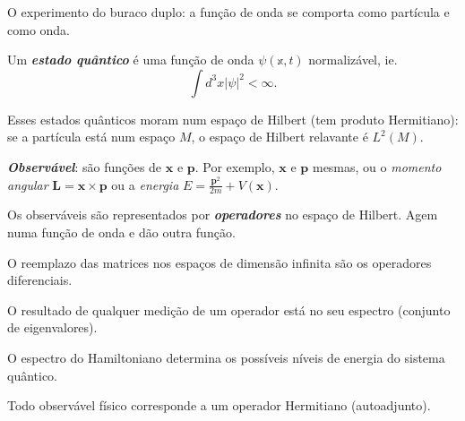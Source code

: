  O experimento do buraco duplo: a fun\c c\~ao de onda se comporta como part\'icula e como onda.

 \begin{defn}
 	Um \textit{\textbf{estado qu\^antico}} \'e uma fun\c c\~ao de onda $\psi(\mathbb{x},t)$ normaliz\'avel, ie.
	\[\int d^3x|\psi|^2<\infty.\]
 \end{defn}
 Esses estados qu\^anticos moram num espaço de Hilbert (tem produto Hermitiano): se a part\'icula est\'a num espaço $M$, o espaço de Hilbert relavante \'e $L^2(M)$.

\begin{defn}
	\textit{\textbf{Observ\'avel}}: s\~ao fun\c c\~oes  de $\mathbf{x}$ e $\mathbf{p}$. Por exemplo, $\mathbf{x}$ e $\mathbf{p}$ mesmas, ou o \textit{momento angular} $\mathbf{L}=\mathbf{x}\times \mathbf{p}$ ou a \textit{energia} $E=\frac{\mathbf{p}^2}{2m}+V(\mathbf{x})$.

	Os observ\'aveis s\~ao representados por \textit{\textbf{operadores}} no espaço de Hilbert. Agem numa fun\c c\~ao de onda e d\~ao outra fun\c c\~ao.
\end{defn}

\begin{remark}
	O reemplazo das matrices nos espaços de dimens\~ao infinita s\~ao os operadores diferenciais.
\end{remark}

\begin{remark}
	O resultado de qualquer medi\c c\~ao de um operador est\'a no seu espectro (conjunto de eigenvalores).
\end{remark}

O espectro do Hamiltoniano determina os poss\'iveis n\'iveis de energia do sistema qu\^antico.

Todo observ\'avel f\'isico corresponde a um operador Hermitiano (autoadjunto).


